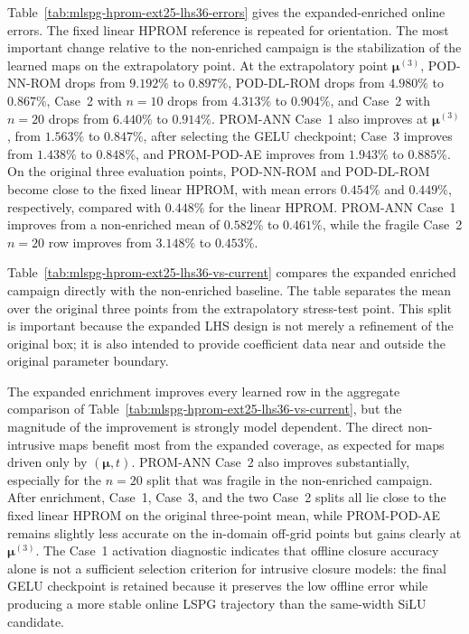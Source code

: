 \documentclass[11pt]{article}
\begin{document}
Table~\ref{tab:mlspg-hprom-ext25-lhs36-errors} gives the expanded-enriched
online errors.  The fixed linear HPROM reference is repeated for orientation.
The most important change relative to the non-enriched campaign is the
stabilization of the learned maps on the extrapolatory point.  At the
extrapolatory point $\bm\mu^{(3)}$, POD-NN-ROM drops from $9.192\%$ to
$0.897\%$, POD-DL-ROM drops from $4.980\%$ to $0.867\%$, Case~2 with $n=10$
drops from $4.313\%$ to $0.904\%$, and Case~2 with $n=20$ drops from
$6.440\%$ to $0.914\%$.  PROM-ANN Case~1 also improves at
$\bm\mu^{(3)}$, from $1.563\%$ to $0.847\%$, after selecting the GELU
checkpoint; Case~3 improves from $1.438\%$ to $0.848\%$, and PROM-POD-AE
improves from $1.943\%$ to $0.885\%$.  On the original three evaluation points,
POD-NN-ROM and POD-DL-ROM become close to the fixed linear HPROM, with mean
errors $0.454\%$ and $0.449\%$, respectively, compared with $0.448\%$ for the
linear HPROM.  PROM-ANN Case~1 improves from a non-enriched mean of
$0.582\%$ to $0.461\%$, while the fragile Case~2 $n=20$ row improves from
$3.148\%$ to $0.453\%$.



Table~\ref{tab:mlspg-hprom-ext25-lhs36-vs-current} compares the expanded
enriched campaign directly with the non-enriched baseline.  The table separates
the mean over the original three points from the extrapolatory stress-test
point.  This split is important because the expanded LHS design is not merely a
refinement of the original box; it is also intended to provide coefficient data
near and outside the original parameter boundary.



The expanded enrichment improves every learned row in the aggregate comparison
of Table~\ref{tab:mlspg-hprom-ext25-lhs36-vs-current}, but the magnitude of
the improvement is strongly model dependent.  The direct non-intrusive maps
benefit most from the expanded coverage, as expected for maps driven only by
$(\bm\mu,t)$.  PROM-ANN Case~2 also improves substantially, especially for
the $n=20$ split that was fragile in the non-enriched campaign.  After
enrichment, Case~1, Case~3, and the two Case~2 splits all lie close to the
fixed linear HPROM on the original three-point mean, while PROM-POD-AE remains
slightly less accurate on the in-domain off-grid points but gains clearly at
$\bm\mu^{(3)}$.  The Case~1 activation diagnostic indicates
that offline closure accuracy alone is not a sufficient selection criterion
for intrusive closure models: the final GELU checkpoint is retained because it
preserves the low offline error while producing a more stable online LSPG
trajectory than the same-width SiLU candidate.
\end{document}
